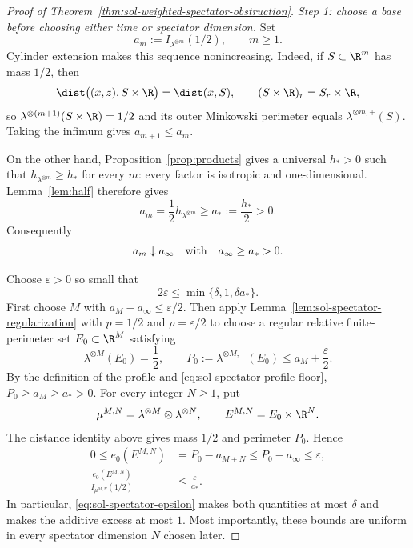 \documentclass[../main.tex]{subfiles}
\begin{document}
\begin{proof}[Proof of Theorem~\ref{thm:sol-weighted-spectator-obstruction}]
\emph{Step 1: choose a base before choosing either time or spectator dimension.}
Set
\[
  a_m:=I_{\lambda^{\otimes m}}(1/2),\qquad m\ge1.
\]
Cylinder extension makes this sequence nonincreasing.  Indeed, if
$S\subset\R^m$ has mass $1/2$, then
\[
  \dist\bigl((x,z),S\times\R\bigr)=\dist(x,S),
  \qquad
  (S\times\R)_r=S_r\times\R,
\]
so $\lambda^{\otimes(m+1)}(S\times\R)=1/2$ and its outer Minkowski perimeter equals
$\lambda^{\otimes m,+}(S)$.  Taking the infimum gives $a_{m+1}\le a_m$.

On the other hand, Proposition~\ref{prop:products} gives a universal $h_*>0$ such that
$h_{\lambda^{\otimes m}}\ge h_*$ for every $m$: every factor is isotropic and
one-dimensional.  Lemma~\ref{lem:half} therefore gives
\begin{equation}
  a_m=\frac12h_{\lambda^{\otimes m}}\ge a_*:=\frac{h_*}{2}>0.
  \label{eq:sol-spectator-profile-floor}
\end{equation}
Consequently
\[
  a_m\downarrow a_\infty\quad\hbox{with}\quad a_\infty\ge a_*>0.
\]

Choose $\varepsilon>0$ so small that
\begin{equation}
  2\varepsilon\le\min\{\delta,1,\delta a_*\}.
  \label{eq:sol-spectator-epsilon}
\end{equation}
First choose $M$ with $a_M-a_\infty\le\varepsilon/2$.  Then apply
Lemma~\ref{lem:sol-spectator-regularization} with $p=1/2$ and $\rho=\varepsilon/2$ to choose
a regular relative finite-perimeter set $E_0\subset\R^M$ satisfying
\begin{equation}
  \lambda^{\otimes M}(E_0)=\frac12,
  \qquad
  P_0:=\lambda^{\otimes M,+}(E_0)\le a_M+\frac\varepsilon2.
  \label{eq:sol-spectator-base}
\end{equation}
By the definition of the profile and \eqref{eq:sol-spectator-profile-floor},
$P_0\ge a_M\ge a_*>0$.  For every integer $N\ge1$, put
\[
  \mu^{M,N}=\lambda^{\otimes M}\otimes\lambda^{\otimes N},
  \qquad
  E^{M,N}=E_0\times\R^N.
\]
The distance identity above gives mass $1/2$ and perimeter $P_0$.  Hence
\begin{align}
  0\le e_0(E^{M,N})
  &=P_0-a_{M+N}
    \le P_0-a_\infty\le\varepsilon,
    \label{eq:sol-spectator-additive}\\
  \frac{e_0(E^{M,N})}{I_{\mu^{M,N}}(1/2)}
  &\le\frac{\varepsilon}{a_*}.
    \label{eq:sol-spectator-relative}
\end{align}
In particular, \eqref{eq:sol-spectator-epsilon} makes both quantities at most $\delta$ and
makes the additive excess at most $1$.  Most importantly, these bounds are uniform in every
spectator dimension $N$ chosen later.


\end{proof}
\end{document}
